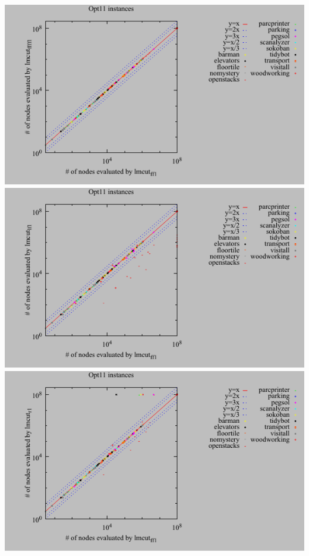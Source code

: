 \includegraphics{tables/opt11-evaluated-lmcut_ff-lmcut_ffff.pdf}
\linebreak
\includegraphics{tables/opt11-evaluated-lmcut_ff-lmcut_lf.pdf}
\linebreak
\includegraphics{tables/opt11-evaluated-lmcut_ff-lmcut_r.pdf}
\linebreak
